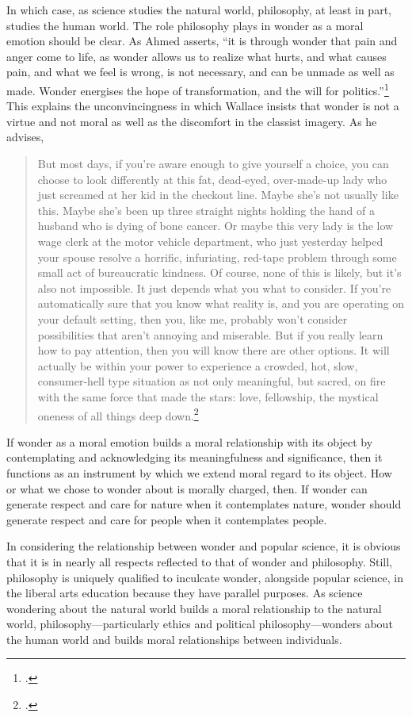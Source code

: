 \documentclass[letterpaper,notitlepage,12pt]{article}
\begin{document}
In which case, as science studies the natural world, philosophy, at least in
part,  studies the human world.
The role philosophy plays in wonder as a moral emotion should be clear.
As Ahmed asserts, ``it is through wonder that pain and anger come to life, as
wonder allows us to realize what hurts, and what causes pain, and what we feel
is wrong, is not necessary, and can be unmade as well as made. Wonder energises
the hope of transformation, and the will for politics.''\footcite[p.
181]{ahmed_cultural_2004}
This explains the unconvincingness in which Wallace insists that wonder is not a
virtue and not moral as well as the discomfort in the classist imagery.
As he advises,
\begin{quotation}
But most days, if you're aware enough to give yourself a choice, you can choose
to look differently at this fat, dead-eyed, over-made-up lady who just screamed
at her kid in the checkout line. Maybe she's not usually like this. Maybe she's
been up three straight nights holding the hand of a husband who is dying of bone
cancer. Or maybe this very lady is the low wage clerk at the motor vehicle
department, who just yesterday helped your spouse resolve a horrific,
infuriating, red-tape problem through some small act of bureaucratic kindness.
Of course, none of this is likely, but it's also not impossible. It just depends
what you what to consider. If you're automatically sure that you know what
reality is, and you are operating on your default setting, then you, like me,
probably won't consider possibilities that aren't annoying and miserable. But if
you really learn how to pay attention, then you will know there are other
options. It will actually be within your power to experience a crowded, hot,
slow, consumer-hell type situation as not only meaningful, but sacred, on fire
with the same force that made the stars: love, fellowship, the mystical oneness
of all things deep down.\footcite{david_foster_wallace_this_2005}
\end{quotation}
If wonder as a moral emotion builds a moral relationship with its object by
contemplating and acknowledging its meaningfulness and significance, then it
functions as an instrument by which we extend moral regard to its object.
How or what we chose to wonder about is morally charged, then.
If wonder can generate respect and care for nature when it contemplates nature,
wonder should generate respect and care for people when it contemplates people.

In considering the relationship between wonder and popular science, it is
obvious that it is in nearly all respects reflected to that of wonder and
philosophy.
Still, philosophy is uniquely qualified to inculcate wonder, alongside popular
science, in the liberal arts education because they have parallel purposes.
As science wondering about the natural world builds a moral relationship to the
natural world, philosophy---particularly ethics and political
philosophy---wonders about the human world and builds moral relationships
between individuals.
\end{document}
